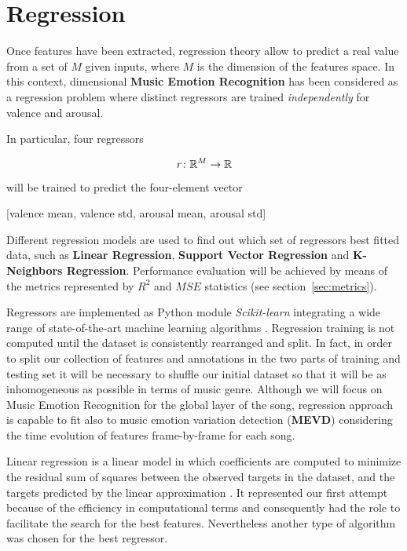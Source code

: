 \section{Regression}\label{sec:regression} %

Once features have been extracted, regression theory allow to predict a real value from a set of $M$ given inputs, where $M$ is the dimension of the features space.
In this context, dimensional \textbf{Music Emotion Recognition} has been considered as a regression problem where distinct regressors are trained \textit{independently} for valence and arousal. 

In particular, four regressors

\[
	r \colon \mathbb{R}^{M} \to \mathbb{R}
\]

will be trained to predict the four-element vector

\begin{center}
	[valence mean, valence std, arousal mean, arousal std]
\end{center}

Different regression models are used to find out which set of regressors best fitted data, such as \textbf{Linear Regression}, \textbf{Support Vector Regression} and \textbf{K-Neighbors Regression}. Performance evaluation will be achieved by means of the metrics represented by $R^2$ and $MSE$ statistics (see section~\ref{sec:metrics}).

Regressors are implemented as Python module \textit{Scikit-learn} integrating a wide range of state-of-the-art machine learning algorithms \cite{scikit-learn}.
Regression training is not computed until the dataset is consistently rearranged and split. In fact, in order to split our collection of features and annotations in the two parts of training and testing set it will be necessary to shuffle our initial dataset so that it will be as inhomogeneous as possible in terms of music genre.
Although we will focus on Music Emotion Recognition for the global layer of the song, regression approach is capable to fit also to music emotion variation detection (\textbf{MEVD}) considering the time evolution of features frame-by-frame for each song.

Linear regression is a linear model in which coefficients are computed to minimize the residual sum of squares between the observed targets in the dataset, and the targets predicted by the linear approximation \cite{scikit-learn}.
It represented our first attempt because of the efficiency in computational terms and consequently had the role to facilitate the search for the best features. Nevertheless another type of algorithm was chosen for the best regressor.

